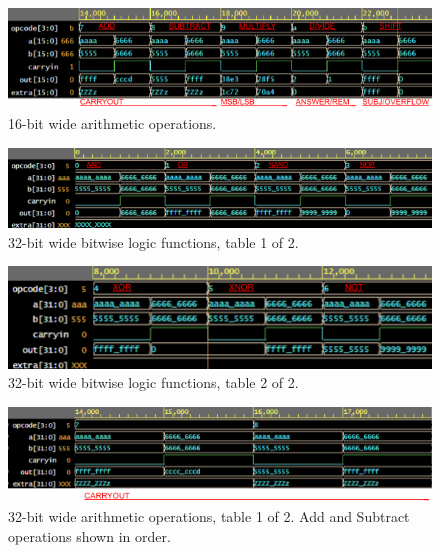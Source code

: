 \documentclass[12pt]{article}
\begin{document}
    \begin{figure}[H]
        \centering
        \includegraphics[width = 1.0\textwidth]{figs/CompArch Final Test Cases 16x labeled OPERATIONS (resized).png}
        \caption{16-bit wide arithmetic operations.}
        \label{fig:enter-label}
    \end{figure}


    \begin{figure}[H]
        \centering
        \includegraphics[width = 1.0\textwidth]{figs/CompArch Final Test Cases 32x labeled GATES (resized 1 of 2).png}
        \caption{32-bit wide bitwise logic functions, table 1 of 2.}
        \label{fig:enter-label}
    \end{figure}
    
    \begin{figure}[H]
        \centering
        \includegraphics[width = 1.0\textwidth]{figs/CompArch Final Test Cases 32x labeled GATES (resized 2 of 2).png}
        \caption{32-bit wide bitwise logic functions, table 2 of 2.}
        \label{fig:enter-label}
    \end{figure}

    \begin{figure}[H]
        \centering
        \includegraphics[width = 1.0\textwidth]{figs/CompArch Final Test Cases 32x labeled OPERATIONS (resized 1 of 2).png}
        \caption{32-bit wide arithmetic operations, table 1 of 2. Add and Subtract operations shown in order.}
        \label{fig:enter-label}
    \end{figure}
\end{document}
